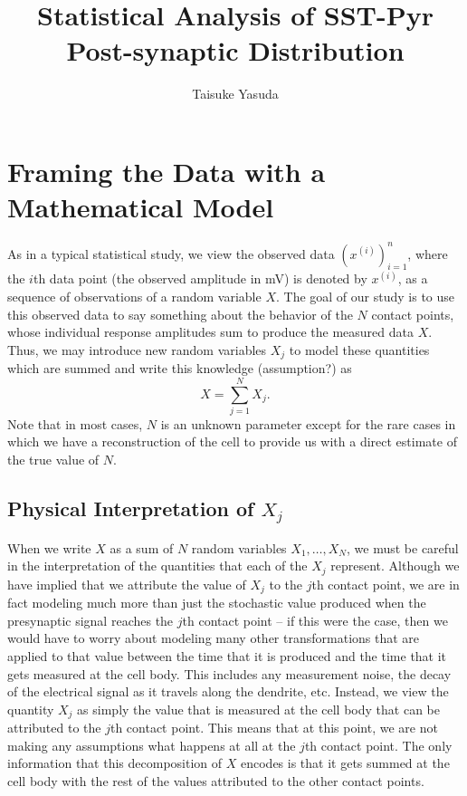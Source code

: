 \documentclass{article}
\title{Statistical Analysis of SST-Pyr Post-synaptic Distribution}
\author{Taisuke Yasuda}
\begin{document}
\maketitle
\tableofcontents
\newpage

\section{Framing the Data with a Mathematical Model}
As in a typical statistical study, we view the observed data $\left(x^{(i)}\right)_{i=1}^n$, where the $i$th data point (the observed amplitude in mV) is denoted by $x^{(i)}$, as a sequence of observations of a random variable $X$. The goal of our study is to use this observed data to say something about the behavior of the $N$ contact points, whose individual response amplitudes sum to produce the measured data $X$. Thus, we may introduce new random variables $X_j$ to model these quantities which are summed and write this knowledge (assumption?) as
\[
	X = \sum_{j=1}^N X_j. 
\]
Note that in most cases, $N$ is an unknown parameter except for the rare cases in which we have a reconstruction of the cell to provide us with a direct estimate of the true value of $N$. 

\subsection{Physical Interpretation of $X_j$}
When we write $X$ as a sum of $N$ random variables $X_1,\dots,X_N$, we must be careful in the interpretation of the quantities that each of the $X_j$ represent. Although we have implied that we attribute the value of $X_j$ to the $j$th contact point, we are in fact modeling much more than just the stochastic value produced when the presynaptic signal reaches the $j$th contact point -- if this were the case, then we would have to worry about modeling many other transformations that are applied to that value between the time that it is produced and the time that it gets measured at the cell body. This includes any measurement noise, the decay of the electrical signal as it travels along the dendrite, etc. Instead, we view the quantity $X_j$ as simply the value that is measured at the cell body that can be attributed to the $j$th contact point. This means that at this point, we are not making any assumptions what happens at all at the $j$th contact point. The only information that this decomposition of $X$ encodes is that it gets summed at the cell body with the rest of the values attributed to the other contact points. 
\end{document}
